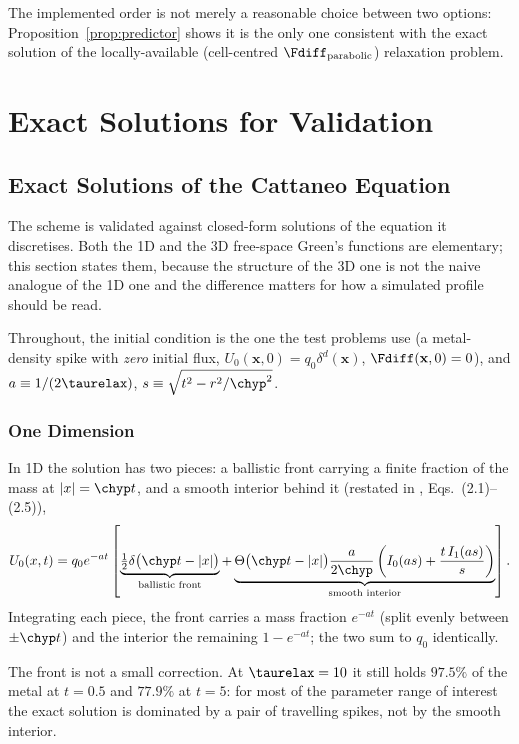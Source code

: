 The implemented order is not merely a reasonable choice between two
options: Proposition~\ref{prop:predictor} shows it is the only one
consistent with the exact solution of the locally-available (cell-centred
$\Fdiff_{\rm parabolic}$) relaxation problem.


\section{Exact Solutions for Validation}

\subsection{Exact Solutions of the Cattaneo Equation}
\label{sec:exact-solutions}

The scheme is validated against closed-form solutions of the equation it
discretises. Both the 1D and the 3D free-space Green's functions are
elementary; this section states them, because the structure of the 3D one
is not the naive analogue of the 1D one and the difference matters for how
a simulated profile should be read.

Throughout, the initial condition is the one the test problems use (a
metal-density spike with \emph{zero} initial flux,
$U_0(\mathbf x,0)=q_0\delta^d(\mathbf x)$, $\Fdiff(\mathbf x,0)=0$), and
$a\equiv1/(2\taurelax)$, $s\equiv\sqrt{t^2-r^2/\chyp^2}$.

\subsubsection{One Dimension}
\label{sec:exact-1d}

In 1D the solution has two pieces: a ballistic front carrying a finite
fraction of the mass at $|x|=\chyp t$, and a smooth interior behind it
\cite{MasoliverPorraWeiss1993} (restated in
\cite{PruestelMeierSchellersheim2013}, Eqs.~(2.1)--(2.5)),
\begin{equation}
  \label{eq:exact-green}
  U_0(x,t) = q_0e^{-at}\left[
    \underbrace{\tfrac12\delta\big(\chyp t-|x|\big)}_{\text{ballistic front}}
    +\underbrace{\Theta\big(\chyp t-|x|\big)\frac{a}{2\chyp}
      \left(I_0(as)+\frac{t\,I_1(as)}{s}\right)}_{\text{smooth interior}}
  \right] .
\end{equation}
Integrating each piece, the front carries a mass fraction $e^{-at}$ (split
evenly between $\pm\chyp t$) and the interior the remaining $1-e^{-at}$;
the two sum to $q_0$ identically.

The front is not a small correction. At $\taurelax=10$ it still holds
$97.5\%$ of the metal at $t=0.5$ and $77.9\%$ at $t=5$: for most of the
parameter range of interest the exact solution is dominated by a pair of
travelling spikes, not by the smooth interior.

